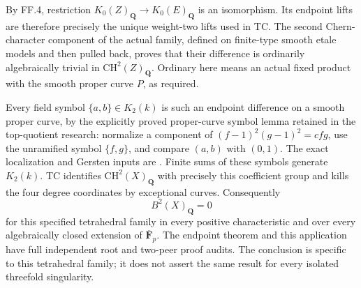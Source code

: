 By FF.4, restriction $K_0(Z)_{\mathbf Q}\to K_0(E)_{\mathbf Q}$
is an isomorphism.  Its endpoint lifts are therefore precisely
the unique weight-two lifts used in TC.  The second Chern-character
component of the actual family, defined on finite-type smooth
etale models and then pulled back, proves that their difference
is ordinarily algebraically trivial in $\mathrm{CH}^2(Z)_{\mathbf Q}$.
Ordinary here means an actual fixed product with the smooth proper
curve $P$, as required.

Every field symbol $\{a,b\}\in K_2(k)$ is such an endpoint
difference on a smooth proper curve, by the explicitly proved
proper-curve symbol lemma retained in the top-quotient research:
normalize a component of $(f-1)^2(g-1)^2=c f g$, use the unramified
symbol $\{f,g\}$, and compare $(a,b)$ with $(0,1)$.
The exact localization and Gersten inputs are
\citet[Section 7, Proposition 3.2 and equation (3.3), p.~127;
Theorem 5.11, pp.~133--134]{rootQuillen1973}.
Finite sums of these symbols generate $K_2(k)$.  TC identifies
$\mathrm{CH}^2(X)_{\mathbf Q}$ with precisely this coefficient
group and kills the four degree coordinates by exceptional curves.
Consequently
\[
              B^2(X)_{\mathbf Q}=0
\]
for this specified tetrahedral family in every positive
characteristic and over every algebraically closed extension of
$\overline{\mathbf F}_p$.  The endpoint theorem and this application have full independent
root and two-peer proof audits.  The conclusion is specific to
this tetrahedral family; it does not assert the same result for
every isolated threefold singularity.
